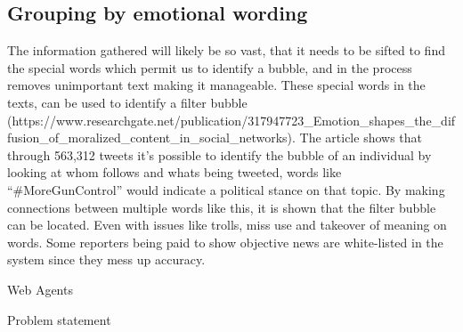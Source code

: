 \subsection{Grouping by emotional wording}
The information gathered will likely be so vast, that it needs to be sifted to find the special words which permit us to identify a bubble, and in the process removes unimportant text making it manageable. These special words in the texts, can be used to identify a filter bubble (https://www.researchgate.net/publication/317947723_Emotion_shapes_the_diffusion_of_moralized_content_in_social_networks). The article shows that through 563,312 tweets it’s possible to identify the bubble of an individual by looking at whom follows and whats being tweeted, words like “#MoreGunControl” would indicate a political stance on that topic. By making connections between multiple words like this, it is shown that the filter bubble can be located. Even with issues like trolls, miss use and takeover of meaning on words. Some reporters being paid to show objective news are white-listed in the system since they mess up accuracy.

Web Agents


Problem statement